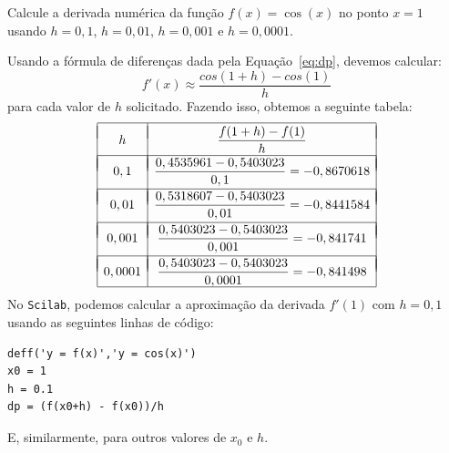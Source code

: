 \begin{ex}\label{ex:dp}
Calcule a derivada numérica da função $f(x)=\cos(x)$ no ponto $x=1$ usando $h=0,1$, $h=0,01$, $h=0,001$ e $h=0,0001$.
\end{ex}
\begin{sol}
Usando a fórmula de diferenças dada pela Equação~\eqref{eq:dp}, devemos calcular:
\begin{equation*}
  f'(x) \approx \frac{cos(1 + h) - cos(1)}{h}
\end{equation*}
para cada valor de $h$ solicitado. Fazendo isso, obtemos a seguinte tabela:
\begin{equation*}
\begin{array}{|c|c|}
\hline
\vspace{-10pt}&\\
h & \dfrac{f(1+h)-f(1)}{h} \\
\vspace{-10pt}&\\
\hline
\vspace{-10pt}&\\
0,1 & \dfrac{0,4535961-0,5403023}{0,1}=- 0,8670618\\
\vspace{-10pt}&\\
\hline
\vspace{-10pt}&\\
0,01 & \dfrac{0,5318607-0,5403023}{0,01}=- 0,8441584\\
\vspace{-10pt}&\\
\hline
\vspace{-10pt}&\\
0,001 & \dfrac{0,5403023-0,5403023}{0,001}=- 0,841741\\
\vspace{-10pt}&\\
\hline
\vspace{-10pt}&\\
0,0001 & \dfrac{0,5403023-0,5403023}{0,0001}=-0,841498\\
\hline
\end{array}  
\end{equation*}
\ifisscilab
No \verb+Scilab+, podemos calcular a aproximação da derivada $f'(1)$ com $h=0,1$ usando as seguintes linhas de código:
\begin{verbatim}
deff('y = f(x)','y = cos(x)')
x0 = 1
h = 0.1
dp = (f(x0+h) - f(x0))/h
\end{verbatim}
E, similarmente, para outros valores de $x_0$ e $h$. 
\fi
\end{sol}

